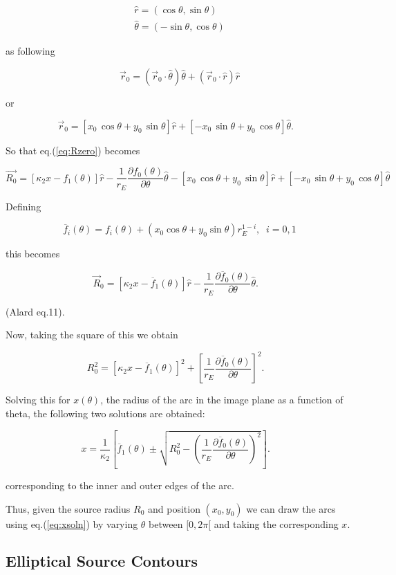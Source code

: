 \documentclass{article}
\def\be{\begin{equation}}
\def\ee{\end{equation}}
\def\bea{\begin{eqnarray}}
\def\eea{\end{eqnarray}}
\def\eqref{eq.(\ref}
\newcommand{\rb}{\right]}
\newcommand{\lb}{\left[}
\def\vecrz{\vec{r}_{0}}
\def\hatr{\hat{r}}
\def\hatth{\hat{\theta}}
\def \te {\theta}
\def \te {\theta}
\begin{document}
\bea
\label{eq:unitvs}
\hat{r}=(\cos\te, \sin \te) \\
\hat{\theta}=(-\sin \te, \cos \te)
\eea

 as following

\be
\vecrz = (\vecrz \cdot \hatth) \hatth + (\vecrz \cdot \hatr) \hatr
\ee

or

\be
\label{eq:rzero}
\vec{r}_{0} = \lb x_0 \,  \cos \te + y_0 \,  \sin \te \rb \hat{r} + \lb -x_0 \,  \sin \te + y_0 \,  \cos \te \rb \hat{\theta}.  \;\;\; 
\ee

So that \eqref{eq:Rzero}) becomes

\be
\vec{R_{0}} = \left[ \kappa_2 x - f_{1}(\theta) \right]\hat{r} - \frac{1}{r_E} \frac{\partial f_0(\theta)}{\partial \theta} \hat{\theta} -  \lb x_0 \,  \cos \te + y_0 \,  \sin \te \rb \hat{r} + \lb -x_0 \,  \sin \te + y_0 \,  \cos \te \rb \hat{\theta} \;\;\; 
\ee

Defining 

\be
\overline{f}_i(\theta) = f_i(\theta) + (x_0 \cos \te + y_0 \sin \te)r_{E}^{1-i}, \;\; i=0,1
\ee

this becomes

\be
\vec{R}_{0} = \left[ \kappa_2 x - \overline{f}_{1}(\theta) \right]\hat{r} - \frac{1}{r_E} \frac{\partial \overline{f}_0(\theta)}{\partial \theta} \hat{\theta}. \;\;\; 
\ee

(Alard eq.11).

Now, taking the square of this we obtain

\be
R_{0}^2 = \left[ \kappa_2 x - \overline{f}_{1}(\theta) \right]^2 + \left[\frac{1}{r_E} \frac{\partial \overline{f}_0(\theta)}{\partial \theta}\right]^2. \;\;\; 
\ee

Solving this for $x(\te)$, the radius of the arc in the image plane as
a function of theta, the following two solutions are obtained:

\be
\label{eq:xsoln}
x = \frac{1}{\kappa_2}\left[ \overline{f}_{1}(\theta) \pm \sqrt{R_0^2 - \left( \frac{1}{r_E}\frac{\partial \overline{f}_0(\theta)}{\partial \theta} \right)^2} \right]. \;\;\; 
\ee

corresponding to the inner and outer edges of the arc.

Thus, given the source radius $R_{0}$ and position $(x_0,y_0)$ we can
draw the arcs using \eqref{eq:xsoln}) by varying $\theta$ between
$[0,2\pi[$ and taking the corresponding $x$.


\subsection{Elliptical Source Contours}
\end{document}

